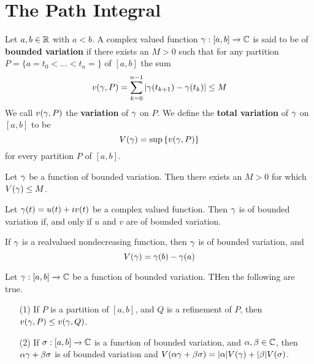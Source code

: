 \section{The Path Integral}

\begin{definition}
    Let $a,b \in \mathbb{R}$ with  $a<b$. A complex valued function $\gamma:[a,b]
    \xrightarrow{} \mathbb{C}$ is said to be of \textbf{bounded variation} if there
    exists an $M>0$ such that for any partition $P=\{a=t_0<\dots<t_n=\}$ of
    $[a,b]$ the sum
    \begin{equation*}
        v(\gamma,P)=\sum_{k=0}^{n-1}{|\gamma(t_{k+1})-\gamma(t_k)|} \leq M
    \end{equation*}
    We call $v(\gamma,P)$ the \textbf{variation} of $\gamma$ on  $P$. We define the
     \textbf{total variation} of $\gamma$ on  $[a,b]$ to be
     \begin{equation*}
         V(\gamma)=\sup{\{v(\gamma,P)\}}
     \end{equation*}
     for every partition $P$ of  $[a,b]$.
\end{definition}

\begin{lemma}\label{4.1.1}
    Let $\gamma$ be a function of bounded variation. Then there exists an  $M>0$
    for which  $V(\gamma) \leq M$.
\end{lemma}

\begin{lemma}\label{4.1.2}
    Let $\gamma(t)=u(t)+iv(t)$ be a complex valued function. Then $\gamma$ is of bounded
    variation if, and only if $u$ and $v$ are of bounded variation.
\end{lemma}

\begin{lemma}\label{4.1.3}
    If $\gamma$ is a realvalued nondecreasing function, then  $\gamma$ is of bounded
    variation, and
    \begin{equation*}
        V(\gamma)=\gamma(b)-\gamma(a)
    \end{equation*}
\end{lemma}

\begin{lemma}\label{4.1.4}
    Let $\gamma:[a,b] \xrightarrow{} \mathbb{C}$ be a function of bounded variation. THen
    the following are true.
    \begin{enumerate}
        \item[(1)] If $P$ is a partition of  $[a,b]$, and $Q$ is a refinement of
             $P$, then  $v(\gamma,P) \leq v(\gamma,Q)$.

         \item[(2)] If $\sigma:[a,b] \xrightarrow{} \mathbb{C}$ is a function of bounded
             variation, and $\alpha,\beta \in \mathbb{C}$, then  $\alpha\gamma+\beta\sigma$ is of bounded
             variation and $V(\alpha\gamma+\beta\sigma)=|\alpha|V(\gamma)+|\beta|V(\sigma)$.
    \end{enumerate}
\end{lemma}

